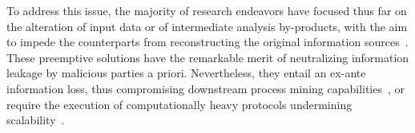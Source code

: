 %
%
%
To address this issue, the majority of research endeavors have focused thus far on the alteration of input data or of intermediate analysis by-products, with the aim to impede the counterparts from reconstructing the original information sources~\cite{DBLP:journals/dke/FahrenkrogPetersenAW23,DBLP:conf/icpm/Fahrenkrog-Petersen19,elkoumy2020shareprom,elkoumy2020secure}. These preemptive solutions have the remarkable merit of neutralizing information leakage by malicious parties a priori. Nevertheless, they entail an ex-ante information loss, thus compromising downstream process mining capabilities~\cite{DBLP:journals/dke/FahrenkrogPetersenAW23,DBLP:conf/icpm/Fahrenkrog-Petersen19}, or require the execution of computationally heavy protocols undermining scalability~\cite{elkoumy2020shareprom,elkoumy2020secure}.

